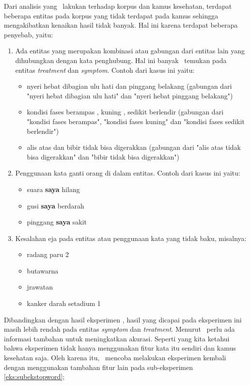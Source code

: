 	Dari analisis yang \saya~lakukan terhadap korpus dan kamus kesehatan, terdapat beberapa entitas pada korpus yang tidak terdapat pada kamus sehingga mengakibatkan kenaikan hasil tidak banyak. Hal ini karena terdapat beberapa penyebab, yaitu:
	\begin{enumerate}
		\item Ada entitas yang merupakan kombinasi atau gabungan dari entitas lain yang dihubungkan dengan kata penghubung. Hal ini banyak \saya~temukan pada entitas \textit{treatment} dan \textit{symptom}. Contoh dari kasus ini yaitu:
		\begin{itemize}
			\item nyeri hebat dibagian ulu hati dan pinggang belakang (gabungan dari "nyeri hebat dibagian ulu hati" dan "nyeri hebat pinggang belakang")
			\item kondisi fases berampas , kuning , sedikit berlendir (gabungan dari "kondisi fases berampas", "kondisi fases kuning" dan "kondisi fases sedikit berlendir")
			\item alis atas dan bibir tidak bisa digerakkan (gabungan dari "alis atas tidak bisa digerakkan" dan "bibir tidak bisa digerakkan")
		\end{itemize}
		
		\item Penggunaan kata ganti orang di dalam entitas. Contoh dari kasus ini yaitu:
		\begin{itemize}
			\item suara \textbf{saya} hilang
			\item gusi \textbf{saya} berdarah
			\item pinggang \textbf{saya} sakit
		\end{itemize}
		
		\item Kesalahan eja pada entitas atau penggunaan kata yang tidak baku, misalnya:
		\begin{itemize}
			\item radang paru 2
			\item butawarna
			\item jrawatan
			\item kanker darah setadium 1
		\end{itemize}
	\end{enumerate}

	Dibandingkan dengan hasil eksperimen \cite{skripsiKakRadit}, hasil yang dicapai pada eksperimen ini masih lebih rendah pada entitas \textit{symptom} dan \textit{treatment}. Menurut \saya~perlu ada informasi tambahan untuk meningkatkan akurasi. Seperti yang kita ketahui bahwa eksperimen \cite{skripsiKakRadit} tidak hanya menggunakan fitur kata itu sendiri dan kamus kesehatan saja. Oleh karena itu, \saya~mencoba melakukan eksperimen kembali dengan menggunakan tambahan fitur lain pada sub-eksperimen \ref{eks:subekstopword};
	
